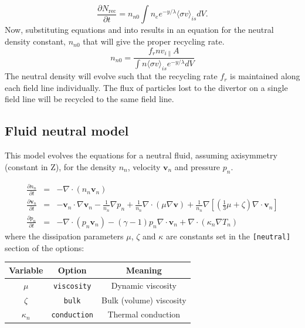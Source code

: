 \documentclass[12pt,a4paper]{article}
\newcommand{\deriv}[2]{\frac{\partial #1}{\partial #2}}
\begin{document}
\begin{equation}
\deriv{N_{\text{rec}}}{t} = n_{n0} \int n_e e^{-y/\lambda} \langle \sigma v \rangle_{is} dV.
\end{equation}
Now, substituting equations  and into results in an equation for the neutral density constant, $n_{n0}$ that will give the proper recycling rate.
\begin{equation}
n_{n0} = \frac{f_r nv_{i\parallel}A}{\int n \langle\sigma v\rangle_{is} e^{-y/\lambda}dV} 
\end{equation}
The neutral density will evolve such that the recycling rate $f_r$ is maintained along each field line individually.  The flux of particles lost to the divertor on a single field line will be recycled to the same field line.

\subsection{Fluid neutral model}

This model evolves the equations for a neutral fluid, assuming
axisymmetry (constant in Z), for the density $n_n$, velocity $\mathbf{v}_n$
and pressure $p_n$.

\begin{eqnarray}
\frac{\partial n_n}{\partial t} &=& -\nabla\cdot\left(n_n\mathbf{v}_n\right) \nonumber \\
\frac{\partial \mathbf{v}_n}{\partial t} &=& - \mathbf{v}_n\cdot\nabla\mathbf{v}_n -\frac{1}{n_n}\nabla p_n + \frac{1}{n_n}\nabla\cdot\left(\mu \nabla\mathbf{v}\right) + \frac{1}{n_n}\nabla\left[ \left(\frac{1}{3}\mu + \zeta\right)\nabla\cdot\mathbf{v}_n\right] \\
\frac{\partial p_n}{\partial t} &=& -\nabla\cdot\left(p_n\mathbf{v}_n\right) - \left(\gamma - 1\right)p_n\nabla\cdot\mathbf{v}_n + \nabla\cdot\left(\kappa_n \nabla T_n\right) \nonumber
\end{eqnarray}
where the dissipation parameters $\mu$, $\zeta$ and $\kappa$ are constants
set in the \texttt{[neutral]} section of the options:

\begin{center}
\begin{tabular}{ccc}
Variable & Option & Meaning \\
\hline
\hline
$\mu$ & \texttt{viscosity} & Dynamic viscosity \\
$\zeta$ & \texttt{bulk} & Bulk (volume) viscosity \\
$\kappa_n$ & \texttt{conduction} & Thermal conduction \\
\hline
\hline
\end{tabular}
\end{center}
\end{document}

